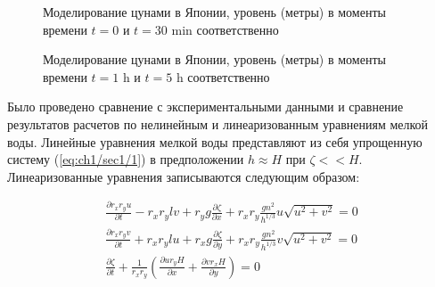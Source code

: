 \begin{figure}[htb!]
	\begin{minipage}[h]{0.49\linewidth}
	\end{minipage}
	\hfill
	\begin{minipage}[h]{0.49\linewidth}
	\end{minipage}
	\caption{Моделирование цунами в Японии, уровень (метры) в моменты времени $t=0$ и $t=30$ min соответственно}
	\label{fig:Tohoku1}
\end{figure}
	
\begin{figure}[htb!]
	\begin{minipage}[h]{0.49\linewidth}
	\end{minipage}
	\hfill
	\begin{minipage}[h]{0.49\linewidth}
	\end{minipage}
	\caption{Моделирование цунами в Японии, уровень (метры) в моменты времени $t=1$ h и $t=5$ h соответственно}
	\label{fig:Tohoku2}
\end{figure}
	
Было проведено сравнение с экспериментальными данными и сравнение результатов расчетов по нелинейным и линеаризованным уравнениям мелкой воды. 
Линейные уравнения мелкой воды представляют из себя упрощенную систему (\ref{eq:ch1/sec1/1}) в предположении $h \approx H$ при $\zeta << H$. Линеаризованные уравнения записываются следующим образом:

\begin{equation} \label{eq:1linear} 
	\begin{array}{c} 
	\displaystyle{\frac{\partial r_{x} r_{y} u}{\partial t} - r_{x} r_{y} l v + r_{y} g\frac{\partial \zeta }{\partial x} + r_x r_y \frac{g n^2}{h^{1/3}} u \sqrt{u^2 + v^2}= 0} \\ 
	
	\displaystyle{\frac{\partial r_{x} r_{y} v}{\partial t} + r_{x} r_{y} l u  +r_{x} g\frac{\partial \zeta }{\partial y} + r_x r_y \frac{g n^2}{h^{1/3}} v \sqrt{u^2 + v^2}= 0} \\ 
	
	\displaystyle{\frac{\partial \zeta}{\partial t} +\frac{1}{r_{x} r_{y} } \left(\frac{\partial u r_{y} H}{\partial x} +\frac{\partial v r_{x} H}{\partial y} \right)= 0} 
	\end{array} 
\end{equation}

